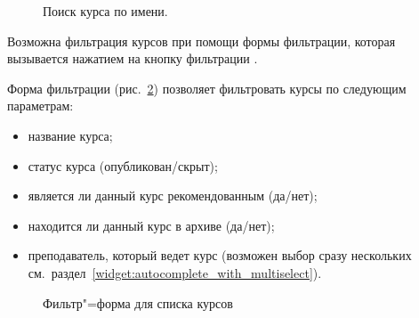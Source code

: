 \begin{figure}[H]
	\caption{Поиск курса по имени.}
	\label{img:course:course_filter}
\end{figure}

Возможна фильтрация курсов при помощи формы фильтрации, которая вызывается нажатием на кнопку фильтрации .

Форма фильтрации (рис.~\ref{img:course:course_filter_form}) позволяет фильтровать курсы по следующим параметрам:
\begin{itemize}
	\item название курса;
	\item статус курса (опубликован/скрыт);
	\item является ли данный курс рекомендованным (да/нет);
	\item находится ли данный курс в архиве (да/нет);
	\item преподаватель, который ведет курс (возможен выбор сразу нескольких см.\ раздел~\ref{widget:autocomplete_with_multiselect}).
\end{itemize}

\begin{figure}[H]
	\caption{Фильтр"=форма для списка курсов}
	\label{img:course:course_filter_form}
\end{figure}

